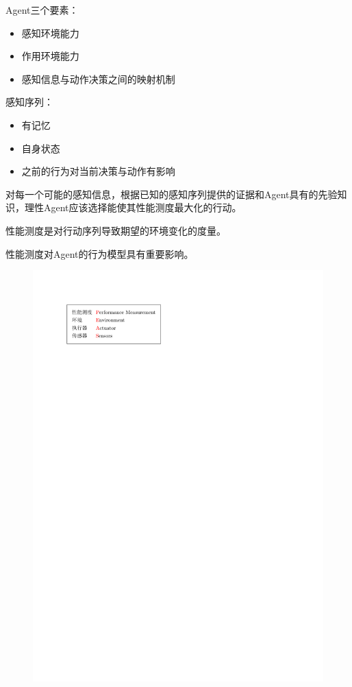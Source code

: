 Agent三个要素：
\begin{itemize}
    \item 感知环境能力
    \item 作用环境能力
    \item 感知信息与动作决策之间的映射机制
\end{itemize}

感知序列：
\begin{itemize}
    \item 有记忆
    \item 自身状态
    \item 之前的行为对当前决策与动作有影响
\end{itemize}

\begin{definition}[理性Agent]
    对每一个可能的感知信息，根据已知的感知序列提供的证据和Agent具有的先验知识，理性Agent应该选择能使其性能测度最大化的行动。
\end{definition}
\begin{definition}[性能测度]
    性能测度是对行动序列导致期望的环境变化的度量。
\end{definition}
性能测度对Agent的行为模型具有重要影响。

\begin{figure}[htbp]
    \centering
    \includegraphics{image/PEAS.pdf}
\end{figure}

